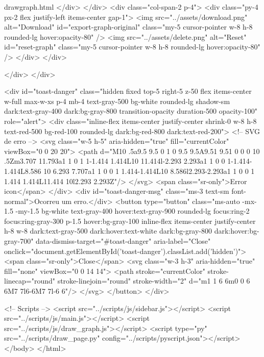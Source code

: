 \documentclass[12pt,a4paper]{article}
\def\_{}%
\begin{document}
\begin{htmlbox}{draw\_graph.html}
                </div>
            </div>
            <div class="col-span-2 p-4">
                <div class="py-4 px-2 flex justify-left items-center gap-1">
                    <img src="../assets/download.png" alt="Download" id="export-graph-original"
                        class="my-5 cursor-pointer w-8 h-8 rounded-lg hover:opacity-80" />
                    <img src="../assets/delete.png" alt="Reset" id="reset-graph"
                        class="my-5 cursor-pointer w-8 h-8 rounded-lg hover:opacity-80" />
                </div>
            </div>

        </div>
    </div>

    <div id="toast-danger" class="hidden fixed top-5 right-5 z-50 flex items-center w-full max-w-xs p-4 mb-4 text-gray-500 bg-white rounded-lg shadow-sm dark:text-gray-400 dark:bg-gray-800 transition-opacity duration-500 opacity-100" role="alert">
        <div class="inline-flex items-center justify-center shrink-0 w-8 h-8 text-red-500 bg-red-100 rounded-lg dark:bg-red-800 dark:text-red-200">
            <!-- SVG de erro -->
            <svg class="w-5 h-5" aria-hidden="true" fill="currentColor" viewBox="0 0 20 20">
                <path d="M10 .5a9.5 9.5 0 1 0 9.5 9.5A9.51 9.51 0 0 0 10 .5Zm3.707 11.793a1 1 0 1 1-1.414 1.414L10 11.414l-2.293 2.293a1 1 0 0 1-1.414-1.414L8.586 10 6.293 7.707a1 1 0 0 1 1.414-1.414L10 8.586l2.293-2.293a1 1 0 0 1 1.414 1.414L11.414 10l2.293 2.293Z"/>
            </svg>
            <span class="sr-only">Error icon</span>
        </div>
        <div id="toast-danger-msg" class="ms-3 text-sm font-normal">Ocorreu um erro.</div>
        <button type="button" class="ms-auto -mx-1.5 -my-1.5 bg-white text-gray-400 hover:text-gray-900 rounded-lg focus:ring-2 focus:ring-gray-300 p-1.5 hover:bg-gray-100 inline-flex items-center justify-center h-8 w-8 dark:text-gray-500 dark:hover:text-white dark:bg-gray-800 dark:hover:bg-gray-700" data-dismiss-target="#toast-danger" aria-label="Close" onclick="document.getElementById('toast-danger').classList.add('hidden')">
            <span class="sr-only">Close</span>
            <svg class="w-3 h-3" aria-hidden="true" fill="none" viewBox="0 0 14 14">
                <path stroke="currentColor" stroke-linecap="round" stroke-linejoin="round" stroke-width="2" d="m1 1 6 6m0 0 6 6M7 7l6-6M7 7l-6 6"/>
            </svg>
        </button>
    </div>

    <!-- Scripts -->
    <script src="../scripts/js/sidebar.js"></script>
    <script src="../scripts/js/main.js"></script>
    <script src="../scripts/js/draw_graph.js"></script>
    <script type="py" src="../scripts/draw_page.py" config="../scripts/pyscript.json"></script>
</body>
</html>
\end{htmlbox}
\end{document}
